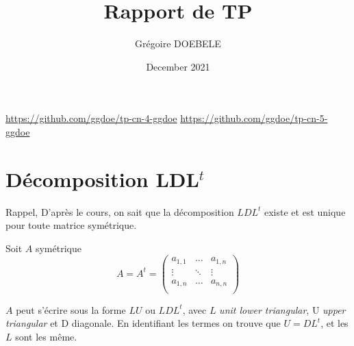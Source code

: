 \documentclass{article}
\title{Rapport de TP}
\author{Grégoire DOEBELE }
\date{December 2021}
\begin{document}
\newcommand{\tikzmark}[1]{\tikz[overlay,remember picture] \node (#1) {};}
\newcommand{\DrawBox}[4][]{%
    \tikz[overlay,remember picture]{%
        \coordinate (TopLeft)     at ($(#2)+(-0.2em,0.9em)$);
        \coordinate (BottomRight) at ($(#3)+(0.2em,-0.3em)$);
        \path (TopLeft); \pgfgetlastxy{\XCoord}{\IgnoreCoord};
        \path (BottomRight); \pgfgetlastxy{\IgnoreCoord}{\YCoord};
        \coordinate (LabelPoint) at ($(\XCoord,\YCoord)!0.5!(BottomRight)$);
        \draw [red,#1] (TopLeft) rectangle (BottomRight);
        \node [below, #1, fill=none, fill opacity=1] at (LabelPoint) {#4};
    }
}


\maketitle

\noindent
\href{https://github.com/ggdoe/tp-cn-4-ggdoe}{https://github.com/ggdoe/tp-cn-4-ggdoe}\newline
\href{https://github.com/ggdoe/tp-cn-5-ggdoe}{https://github.com/ggdoe/tp-cn-5-ggdoe}

\section{Décomposition LDL\(^t\)}

Rappel,\newline
D'après le cours, on sait que la décomposition \(LDL^t\) existe et est unique pour toute matrice symétrique.

Soit \(A\) symétrique
\[
	A = A^t = 
	\begin{pmatrix}
	a_{1,1}	& \dots	& a_{1,n} 	\\
	\vdots	& \ddots& \vdots	\\
	a_{1,n}	& \dots & a_{n,n} 	\\
	\end{pmatrix}
\]

\(A\) peut s'écrire sous la forme \(LU\) ou \(LDL^t\), avec \(L\) \textit{unit lower triangular}, U \textit{upper triangular} et D diagonale.
En identifiant les termes on trouve que \(U = DL^t\), et les \(L\) sont les même.
\end{document}
